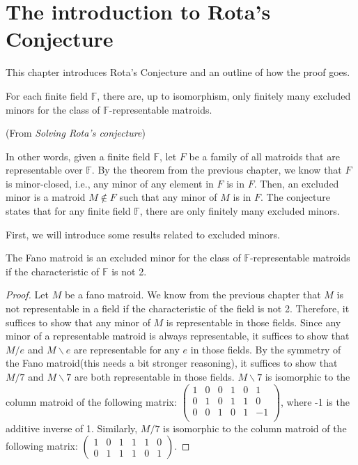 \section{The introduction to Rota's Conjecture}
This chapter introduces Rota's Conjecture and an outline of how the proof goes.

\begin{conj}
For each finite field $\mathbb{F}$, there are, up to isomorphism, only finitely many excluded minors for the class of $\mathbb{F}$-representable matroids.
\end{conj}(From \textit{Solving Rota's conjecture})

In other words, given a finite field $\mathbb{F}$, let $F$ be a family of all matroids that are representable over $\mathbb{F}$.
By the theorem from the previous chapter, we know that $F$ is minor-closed, i.e., any minor of any element in $F$ is in $F$.
Then, an excluded minor is a matroid $M \notin F$ such that any minor of $M$ is in $F$.
The conjecture states that for any finite field $\mathbb{F}$, there are only finitely many excluded minors.

First, we will introduce some results related to excluded minors.

\begin{thm}
The Fano matroid is an excluded minor for the class of $\mathbb{F}$-representable matroids if the characteristic of $\mathbb{F}$ is not 2.
\end{thm}
\begin{proof}
Let $M$ be a fano matroid.
We know from the previous chapter that $M$ is not representable in a field if the characteristic of the field is not 2.
Therefore, it suffices to show that any minor of $M$ is representable in those fields.
Since any minor of a representable matroid is always representable, it suffices to show that $M / e$ and $M \backslash e$ are representable for any $e$ in those fields.
By the symmetry of the Fano matroid(this needs a bit stronger reasoning), it suffices to show that $M / 7$ and $M \backslash  7$ are both representable in those fields.
$M \backslash 7$ is isomorphic to the column matroid of the following matrix:
$\begin{pmatrix}
1 & 0 & 0 & 1 & 0 & 1 \\
0 & 1 & 0 & 1 & 1 & 0 \\
0 & 0 & 1 & 0 & 1 & -1 \\
\end{pmatrix}$, where -1 is the additive inverse of 1.
Similarly, $M / 7$ is isomorphic to the column matroid of the following matrix:
$\begin{pmatrix}
1 & 0 & 1 & 1 & 1 & 0 \\
0 & 1 & 1 & 1 & 0 & 1
\end{pmatrix}$.
\end{proof}

